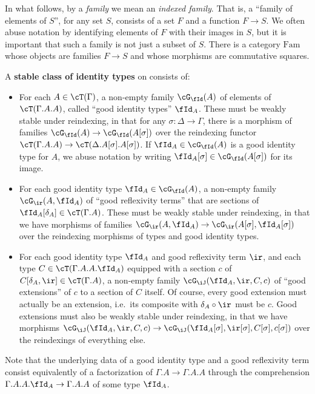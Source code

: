 \documentclass{amsart}
\let\J\iJ
\let\C\cC
\let\T\cT
\let\r\ir
\let\Id\fId
\let\G\cG
\begin{document}
In what follows, by a \emph{family} we mean an \emph{indexed family}.
That is, a ``family of elements of $S$'', for any set $S$, consists of a set $F$ and a function $F\to S$.
We often abuse notation by identifying elements of $F$ with their images in $S$, but it is important that such a family is not just a subset of $S$.
There is a category $\mathrm{Fam}$ whose objects are families $F\to S$ and whose morphisms are commutative squares.

\begin{defn}\label{defn:id}
  A \textbf{stable class of identity types} on \C consists of:
  \begin{itemize}
  \item For each $A\in \T(\Gamma)$, a non-empty family $\G_\Id(A)$ of elements of $\T(\Gamma.A.A)$, called ``good identity types'' $\Id_A$.
    These must be weakly stable under reindexing, in that for any $\sigma:\Delta\to\Gamma$, there is a morphism of families $\G_\Id(A) \to \G_\Id(A[\sigma])$ over the reindexing functor $\T(\Gamma.A.A) \to \T(\Delta.A[\sigma].A[\sigma])$.
    If $\Id_A\in\G_\Id(A)$ is a good identity type for $A$, we abuse notation by writing $\Id_A[\sigma] \in \G_\Id(A[\sigma])$ for its image.
  \item For each good identity type $\Id_A\in\G_\Id(A)$, a non-empty family $\G_\r(A,\Id_A)$ of ``good reflexivity terms'' that are sections of $\Id_A[\delta_A] \in \T(\Gamma.A)$.
    These must be weakly stable under reindexing, in that we have morphisms of families $\G_\r(A,\Id_A) \to \G_\r(A[\sigma],\Id_A[\sigma])$ over the reindexing morphisms of types and good identity types.
  \item For each good identity type $\Id_A$ and good reflexivity term $\r$, and each type $C\in\T(\Gamma.A.A.\Id_A)$ equipped with a section $c$ of $C[\delta_A,\r]\in\T(\Gamma.A)$, a non-empty family $\G_\J(\Id_A,\r,C,c)$ of ``good extensions'' of $c$ to a section of $C$ itself.
    Of course, every good extension must actually be an extension, i.e.\ its composite with $\delta_A \circ \r$ must be $c$.
    Good extensions must also be weakly stable under reindexing, in that we have morphisms $\G_\J(\Id_A,\r,C,c) \to \G_\J(\Id_A[\sigma],\r[\sigma],C[\sigma],c[\sigma])$ over the reindexings of everything else.
  \end{itemize}
\end{defn}

Note that the underlying data of a good identity type and a good reflexivity term consist equivalently of a factorization of $\Gamma.A \to \Gamma.A.A$ through the comprehension $\Gamma.A.A.\Id_A \to \Gamma.A.A$ of some type $\Id_A$.
\end{document}
